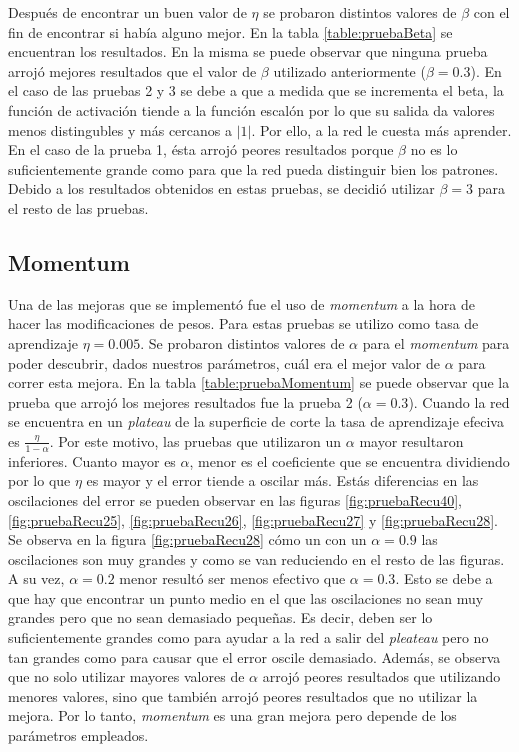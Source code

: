\documentclass[11pt,a4paper]{article}
\begin{document}
Después de encontrar un buen valor de $\eta$ se probaron distintos valores de $\beta$ con el fin de encontrar si había alguno mejor. En la tabla \ref{table:pruebaBeta} se encuentran los resultados. En la misma se puede observar que ninguna prueba arrojó mejores resultados que el valor de $\beta$ utilizado anteriormente ($\beta = 0.3$). En el caso de las pruebas 2 y 3 se debe a que a medida que se incrementa el beta, la función de activación tiende a la función escalón por lo que su salida da valores menos distingubles y más cercanos a $|1|$. Por ello, a la red le cuesta más aprender. En el caso de la prueba 1, ésta arrojó peores resultados porque $\beta$ no es lo suficientemente grande como para que la red pueda distinguir bien los patrones. Debido a los resultados obtenidos en estas pruebas, se decidió utilizar $\beta = 3$ para el resto de las pruebas.

\subsection{Momentum}
Una de las mejoras que se implementó fue el uso de \emph{momentum} a la hora de hacer las modificaciones de pesos. Para estas pruebas se utilizo como tasa de aprendizaje $\eta = 0.005$. Se probaron distintos valores de $\alpha$ para el \emph{momentum} para poder descubrir, dados nuestros parámetros, cuál era el mejor valor de $\alpha$ para correr esta mejora. En la tabla \ref{table:pruebaMomentum} se puede observar que la prueba que arrojó los mejores resultados fue la prueba 2 ($\alpha = 0.3$). Cuando la red se encuentra en un \emph{plateau} de la superficie de corte la tasa de aprendizaje efeciva es $\frac{\eta}{1 - \alpha}$. Por este motivo, las pruebas que utilizaron un $\alpha$ mayor resultaron inferiores. Cuanto mayor es $\alpha$, menor es el coeficiente que se encuentra dividiendo por lo que $\eta$ es mayor y el error tiende a oscilar más. Estás diferencias en las oscilaciones del error se pueden observar en las figuras \ref{fig:pruebaRecu40}, \ref{fig:pruebaRecu25}, \ref{fig:pruebaRecu26}, \ref{fig:pruebaRecu27} y \ref{fig:pruebaRecu28}. Se observa en la figura \ref{fig:pruebaRecu28} cómo un con un $\alpha = 0.9$ las oscilaciones son muy grandes y como se van reduciendo en el resto de las figuras.  A su vez,  $\alpha = 0.2$ menor resultó ser menos efectivo que $\alpha = 0.3$. Esto se debe a que hay que encontrar un punto medio en el que las oscilaciones no sean muy grandes pero que no sean demasiado pequeñas. Es decir, deben ser lo suficientemente grandes como para ayudar a la red a salir del \emph{pleateau} pero no tan grandes como para causar que el error oscile demasiado. Además, se observa que no solo utilizar mayores valores de $\alpha$ arrojó peores resultados que utilizando menores valores, sino que también arrojó peores resultados que no utilizar la mejora. Por lo tanto, \emph{momentum} es una gran mejora pero depende de los parámetros empleados. 
   
\end{document}
